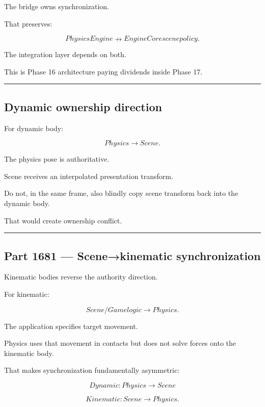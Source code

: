The bridge owns synchronization.

That preserves:

\[
PhysicsEngine
\nrightarrow
EngineCore scene policy.
\]

The integration layer depends on both.

This is Phase 16 architecture paying dividends inside Phase 17.

\begin{center}\rule{0.5\linewidth}{0.5pt}\end{center}

\subsection{Dynamic ownership direction}\label{06-engine-ii-ch037-dynamic-ownership-direction}

For dynamic body:

\[
\boxed{
Physics\rightarrow Scene.
}
\]

The physics pose is authoritative.

Scene receives an interpolated presentation transform.

Do not, in the same frame, also blindly copy scene transform back into the dynamic body.

That would create ownership conflict.

\begin{center}\rule{0.5\linewidth}{0.5pt}\end{center}

\subsection{Part 1681 --- Scene→kinematic synchronization}\label{06-engine-ii-ch037-part-1681-scenekinematic-synchronization}

Kinematic bodies reverse the authority direction.

For kinematic:

\[
\boxed{
Scene/Game logic\rightarrow Physics.
}
\]

The application specifies target movement.

Physics uses that movement in contacts but does not solve forces onto the kinematic body.

That makes synchronization fundamentally asymmetric:

\[
Dynamic:
Physics\rightarrow Scene
\]

\[
Kinematic:
Scene\rightarrow Physics.
\]

